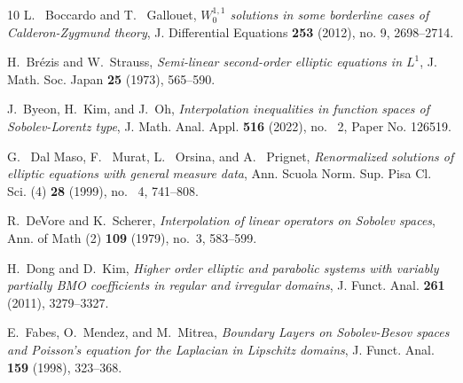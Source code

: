 \documentclass[reqno,centertags,11pt]{amsart}
\theoremstyle{definition}
\numberwithin{thm}{section}
\numberwithin{equation}{section}
\begin{document}
\begin{thebibliography}{10}
 L. ~Boccardo and T. ~Gallouet, \emph{$W^{1,1}_0$ solutions in some borderline cases of Calderon-Zygmund theory},  J. Differential Equations \textbf{253} (2012), no. 9, 2698--2714.


H.~Brézis and W.~Strauss, \emph{Semi-linear second-order elliptic equations in $L^1$}, J. Math. Soc. Japan \textbf{25} (1973), 565--590.



J.~Byeon, H.~Kim, and J.~Oh, \emph{Interpolation inequalities in function
  spaces of Sobolev-Lorentz type},  J. Math. Anal. Appl. \textbf{516} (2022), no. ~2, Paper No. 126519.







G. ~Dal Maso, F. ~Murat, L.  ~Orsina, and A.  ~Prignet, \emph{Renormalized solutions of elliptic equations with general measure data}, Ann. Scuola Norm. Sup. Pisa Cl. Sci. (4) \textbf{28} (1999), no. ~4, 741--808.

R.~DeVore and K.~Scherer, \emph{Interpolation of linear operators on {S}obolev
  spaces}, Ann. of Math (2) \textbf{109} (1979), no.~3, 583--599.


H.~Dong and D.~Kim, \emph{Higher order elliptic and parabolic systems with variably partially BMO coefficients in regular and irregular domains}, J. Funct. Anal. \textbf{261} (2011), 3279--3327.




E.~Fabes, O.~Mendez, and M.~Mitrea, \emph{Boundary Layers on Sobolev-Besov spaces and Poisson's equation for the Laplacian in Lipschitz domains}, J. Funct. Anal. \textbf{159} (1998), 323--368.




\end{thebibliography}
\end{document}
